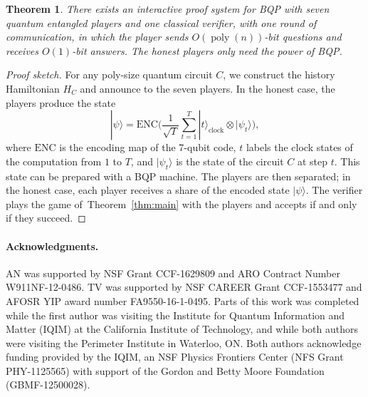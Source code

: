 \documentclass[11pt,letterpaper]{article}
\newcommand{\<}{\langle}
\renewcommand{\>}{\rangle}
\newtheorem{theorem}{Theorem}
\newcommand{\thmref}[1]{Theorem~\ref{thm:#1}}
\newcommand{\ket}[1]{| #1 \>}
\newcommand{\ot}{\otimes}
\DeclareMathOperator{\poly}{poly}
\begin{document}
\begin{theorem}
There exists an interactive proof system for BQP with seven quantum entangled players and one classical verifier, with one round of communication, in which the player sends $O(\poly(n))$-bit questions and receives $O(1)$-bit answers. The honest players only need the power of BQP.
\end{theorem}

\begin{proof}[Proof sketch]
  For any poly-size quantum circuit $C$, we construct the history
  Hamiltonian $H_C$ and announce to the seven players. In the honest
  case, the players produce the state
  \[ \ket{\psi}  = \mathrm{ENC}\Big(\frac{1}{\sqrt{T}} \sum_{t = 1}^{T}
  \ket{t}_{\text{clock}} \ot \ket{\psi_t}\Big), \]
  where $\mathrm{ENC}$ is the encoding map of the 7-qubit code, $t$ labels the clock states of the computation from $1$ to
  $T$, and $\ket{\psi_t}$ is the state of the circuit $C$ at step $t$. This
  state can be prepared with a BQP machine. The players are then
  separated; in the honest case, each player receives a share of the
  encoded state $\ket{\psi}$. The verifier plays the game
  of~\thmref{main} with the players and accepts if and only if they succeed.
\end{proof}



\paragraph{Acknowledgments.}

AN was supported by NSF Grant CCF-1629809 and ARO Contract Number W911NF-12-0486. TV was supported by NSF CAREER Grant CCF-1553477 and AFOSR YIP award number FA9550-16-1-0495. 
Parts of this work was completed while the first author was visiting the Institute for Quantum
Information and Matter (IQIM) at the California Institute of Technology, and while both authors were
visiting the Perimeter Institute in Waterloo, ON. Both authors acknowledge funding provided by the IQIM, an NSF Physics Frontiers Center (NFS Grant PHY-1125565) with support of the Gordon and Betty Moore Foundation (GBMF-12500028). 


\end{document}

